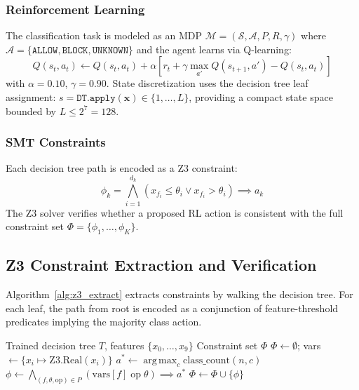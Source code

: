 \documentclass[conference]{IEEEtran}
\DeclareMathOperator*{\argmax}{arg\,max}
\newcommand{\bx}{\mathbf{x}}
\begin{document}
\subsubsection{Reinforcement Learning}
The classification task is modeled as an MDP $\mathcal{M} = (\mathcal{S}, \mathcal{A}, P, R, \gamma)$ where $\mathcal{A} = \{\texttt{ALLOW}, \texttt{BLOCK}, \texttt{UNKNOWN}\}$ and the agent learns via Q-learning:
\begin{equation}
\label{eq:qlearning}
Q(s_t, a_t) \leftarrow Q(s_t, a_t) + \alpha \left[ r_t + \gamma \max_{a'} Q(s_{t+1}, a') - Q(s_t, a_t) \right]
\end{equation}
with $\alpha = 0.10$, $\gamma = 0.90$. State discretization uses the decision tree leaf assignment: $s = \texttt{DT.apply}(\bx) \in \{1, \ldots, L\}$, providing a compact state space bounded by $L \leq 2^7 = 128$.

\subsubsection{SMT Constraints}
Each decision tree path is encoded as a Z3 constraint:
\begin{equation}
\label{eq:z3constraint}
\phi_k = \bigwedge_{i=1}^{d_k} \left( x_{f_i} \leq \theta_i \lor x_{f_i} > \theta_i \right) \implies a_k
\end{equation}
The Z3 solver verifies whether a proposed RL action is consistent with the full constraint set $\Phi = \{\phi_1, \ldots, \phi_K\}$.

\subsection{Z3 Constraint Extraction and Verification}

Algorithm~\ref{alg:z3_extract} extracts constraints by walking the decision tree. For each leaf, the path from root is encoded as a conjunction of feature-threshold predicates implying the majority class action.

\begin{algorithm}[htbp]
\caption{Z3 Constraint Extraction from Decision Tree}
\label{alg:z3_extract}
\footnotesize
\begin{algorithmic}[1]
\Require Trained decision tree $T$, features $\{x_0, \ldots, x_9\}$
\Ensure Constraint set $\Phi$
\State $\Phi \leftarrow \emptyset$; vars $\leftarrow \{x_i \mapsto \text{Z3.Real}(x_i)\}$
        \State $a^* \leftarrow \argmax_c \text{class\_count}(n, c)$
        \State $\phi \leftarrow \bigwedge_{(f, \theta, \text{op}) \in P} (\text{vars}[f] \;\text{op}\; \theta) \implies a^*$
        \State $\Phi \leftarrow \Phi \cup \{\phi\}$
    \Else
        \State {}
        \State {}
    \EndIf
\EndProcedure
\State {}
\end{algorithmic}
\end{algorithm}
\end{document}
